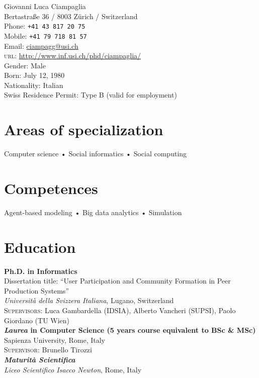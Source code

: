 \documentclass[10pt, a4paper]{article}
\newcommand{\years}[1]{\marginnote{\scriptsize #1}}
\begin{document}
{\LARGE Giovanni Luca Ciampaglia}\\[1cm]
Bertastraße 36 / 8003 Zürich / Switzerland\\[.2cm]
Phone: \texttt{+41 43 817 20 75}\\
Mobile: \texttt{+41 79 718 81 57}\\
Email: \href{mailto:ciampagg@usi.ch}{ciampagg@usi.ch}\\
\textsc{url}: \href{http://www.inf.usi.ch/phd/ciampaglia/}{http://www.inf.usi.ch/phd/ciampaglia/}\\[.2cm]
Gender: Male\\
Born:  July 12, 1980\\
Nationality: Italian\\
Swiss Residence Permit: Type B (valid for employment)

\section*{Areas of specialization}
Computer science • Social informatics • Social computing  

\section*{Competences}
Agent-based modeling • Big data analytics • Simulation

\section*{Education}
\noindent
\years{2011}\textbf{Ph.D. in Informatics}\\
Dissertation title: ``User Participation and Community Formation in Peer
Production Systems''\\
\textsl{Università della Svizzera Italiana}, Lugano, Switzerland\\
\textsc{Supervisors}: Luca Gambardella (IDSIA), Alberto Vancheri (SUPSI), Paolo
Giordano (TU Wien)\\[1em]
\years{2006}\textbf{\textsl{Laurea} in Computer Science (5 years course
equivalent to BSc \& MSc)}\\ Sapienza University, Rome, Italy\\
\textsc{Supervisor}: Brunello Tirozzi \\[1em]
\years{2000}\textbf{\textsl{Maturità Scientifica}}\\
\textsl{Liceo Scientifico Isacco Newton}, Rome, Italy\\
\end{document}
